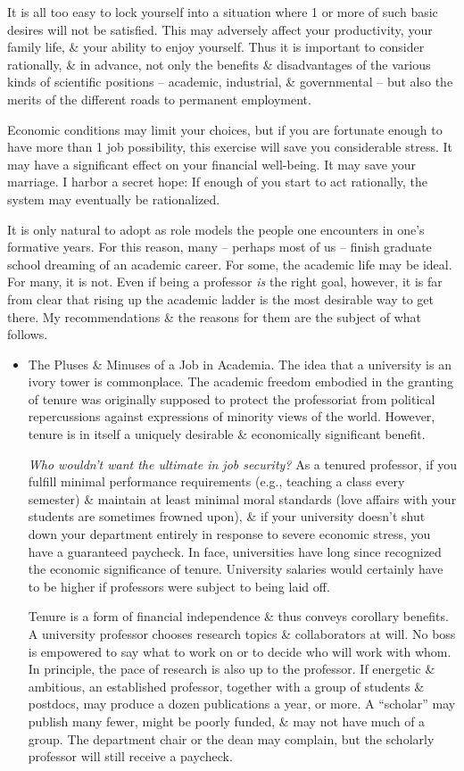 \documentclass{article}
\begin{document}
\begin{enumerate}
\begin{itemize}
		It is all too easy to lock yourself into a situation where 1 or more of such basic desires will not be satisfied. This may adversely affect your productivity, your family life, \& your ability to enjoy yourself. Thus it is important to consider rationally, \& in advance, not only the benefits \& disadvantages of the various kinds of scientific positions -- academic, industrial, \& governmental -- but also the merits of the different roads to permanent employment.

		Economic conditions may limit your choices, but if you are fortunate enough to have more than 1 job possibility, this exercise will save you considerable stress. It may have a significant effect on your financial well-being. It may save your marriage. I harbor a secret hope: If enough of you start to act rationally, the system may eventually be rationalized.

		It is only natural to adopt as role models the people one encounters in one's formative years. For this reason, many -- perhaps most of us -- finish graduate school dreaming of an academic career. For some, the academic life may be ideal. For many, it is not. Even if being a professor \textit{is} the right goal, however, it is far from clear that rising up the academic ladder is the most desirable way to get there. My recommendations \& the reasons for them are the subject of what follows.
		\begin{itemize}
			\item {\sf The Pluses \& Minuses of a Job in Academia.} The idea that a university is an ivory tower is commonplace. The academic freedom embodied in the granting of tenure was originally supposed to protect the professoriat from political repercussions against expressions of minority views of the world. However, tenure is in itself a uniquely desirable \& economically significant benefit.

			\textit{Who wouldn't want the ultimate in job security?} As a tenured professor, if you fulfill minimal performance requirements (e.g., teaching a class every semester) \& maintain at least minimal moral standards (love affairs with your students are sometimes frowned upon), \& if your university doesn't shut down your department entirely in response to severe economic stress, you have a guaranteed paycheck. In face, universities have long since recognized the economic significance of tenure. University salaries would certainly have to be higher if professors were subject to being laid off.

			Tenure is a form of financial independence \& thus conveys corollary benefits. A university professor chooses research topics \& collaborators at will. No boss is empowered to say what to work on or to decide who will work with whom. In principle, the pace of research is also up to the professor. If energetic \& ambitious, an established professor, together with a group of students \& postdocs, may produce a dozen publications a year, or more. A ``scholar'' may publish many fewer, might be poorly funded, \& may not have much of a group. The department chair or the dean may complain, but the scholarly professor will still receive a paycheck.


\end{itemize}
\end{itemize}
\end{enumerate}
\end{document}

